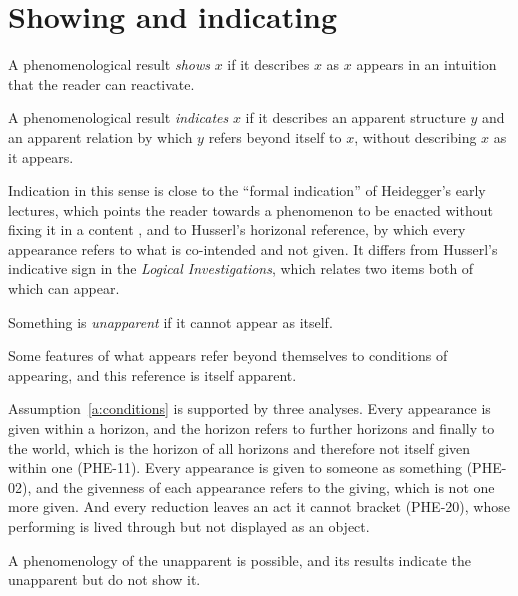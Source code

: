 \documentclass{situationist-preprint}
\begin{document}
\section{Showing and indicating}

\begin{definition}\label{d:show}
A phenomenological result \emph{shows} $x$ if it describes $x$ as $x$ appears in an intuition that the reader can reactivate.
\end{definition}

\begin{definition}\label{d:indicate}
A phenomenological result \emph{indicates} $x$ if it describes an apparent structure $y$ and an apparent relation by which $y$ refers beyond itself to $x$, without describing $x$ as it appears.
\end{definition}

Indication in this sense is close to the \enquote{formal indication} of Heidegger's early lectures, which points the reader towards a phenomenon to be enacted without fixing it in a content \citep{Heidegger1995}, and to Husserl's horizonal reference, by which every appearance refers to what is co-intended and not given. It differs from Husserl's indicative sign in the \emph{Logical Investigations}, which relates two items both of which can appear.

\begin{definition}\label{d:unapparent}
Something is \emph{unapparent} if it cannot appear as itself.
\end{definition}

\begin{assumption}\label{a:conditions}
Some features of what appears refer beyond themselves to conditions of appearing, and this reference is itself apparent.
\end{assumption}

Assumption~\ref{a:conditions} is supported by three analyses. Every appearance is given within a horizon, and the horizon refers to further horizons and finally to the world, which is the horizon of all horizons and therefore not itself given within one (PHE-11). Every appearance is given to someone as something (PHE-02), and the givenness of each appearance refers to the giving, which is not one more given. And every reduction leaves an act it cannot bracket (PHE-20), whose performing is lived through but not displayed as an object.

\begin{theorem}\label{t:main}
A phenomenology of the unapparent is possible, and its results indicate the unapparent but do not show it.
\end{theorem}
\end{document}
